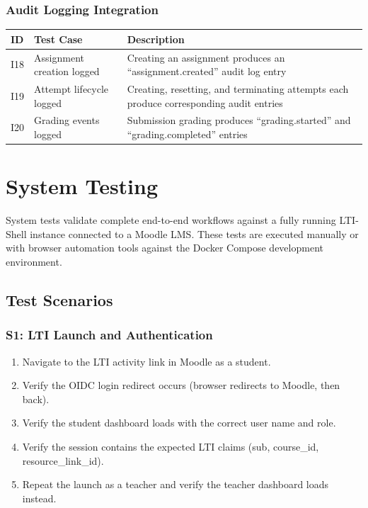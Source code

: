 \documentclass[12pt, letterpaper]{article}
\begin{document}
\subsubsection{Audit Logging Integration}

\begin{longtable}{p{0.5cm} p{4.5cm} p{8.5cm}}
    \toprule
    \textbf{ID} & \textbf{Test Case} & \textbf{Description} \\
    \midrule
    I18 & Assignment creation logged & Creating an assignment produces an ``assignment.created'' audit log entry \\
    I19 & Attempt lifecycle logged & Creating, resetting, and terminating attempts each produce corresponding audit entries \\
    I20 & Grading events logged & Submission grading produces ``grading.started'' and ``grading.completed'' entries \\
    \bottomrule
\end{longtable}

\section{System Testing}

System tests validate complete end-to-end workflows against a fully running LTI-Shell instance connected to a Moodle LMS. These tests are executed manually or with browser automation tools against the Docker Compose development environment.

\subsection{Test Scenarios}

\subsubsection{S1: LTI Launch and Authentication}

\begin{enumerate}
    \item Navigate to the LTI activity link in Moodle as a student.
    \item Verify the OIDC login redirect occurs (browser redirects to Moodle, then back).
    \item Verify the student dashboard loads with the correct user name and role.
    \item Verify the session contains the expected LTI claims (sub, course\_id, resource\_link\_id).
    \item Repeat the launch as a teacher and verify the teacher dashboard loads instead.
\end{enumerate}
\end{document}
